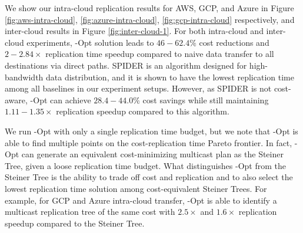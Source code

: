 




We show our intra-cloud replication results for AWS, GCP, and Azure in Figure \ref{fig:aws-intra-cloud}, \ref{fig:azure-intra-cloud}, \ref{fig:gcp-intra-cloud} respectively, and inter-cloud results in Figure \ref{fig:inter-cloud-1}. For both intra-cloud and inter-cloud experiments, \sys{}-Opt solution leads to $46-62.4\%$ cost reductions and $2-2.84\times$ replication time speedup compared to naive data transfer to all destinations via direct paths. SPIDER is an algorithm designed for high-bandwidth data distribution, and it is shown to have the lowest replication time among all baselines in our experiment setups. However, as SPIDER is not cost-aware, \sys{}-Opt can achieve $28.4-44.0\%$ cost savings while still maintaining $1.11-1.35\times$ replication speedup compared to this algorithm. 

We run \sys{}-Opt with only a single replication time budget, but we note that \sys{}-Opt is able to find multiple points on the cost-replication time Pareto frontier. In fact, \sys{}-Opt can generate an equivalent cost-minimizing multicast plan as the Steiner Tree, given a loose replication time budget. What distinguishes \sys{}-Opt from the Steiner Tree is the ability to trade off cost and replication and to also select the lowest replication time solution among cost-equivalent Steiner Trees. For example, for GCP and Azure intra-cloud transfer, \sys{}-Opt is able to identify a multicast replication tree of the same cost with $2.5\times$ and $1.6\times$ replication speedup compared to the Steiner Tree. 

